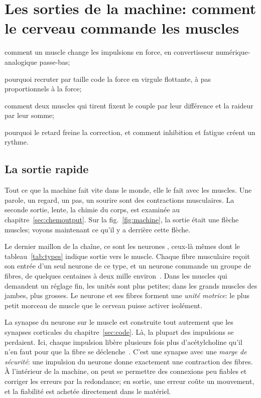 \chapter{Les sorties de la machine: comment le cerveau commande les muscles}
\label{sec:muscles}
\begin{chaptergoals}
\item comment un muscle change les impulsions en force, en convertisseur numérique-analogique passe-bas;
\item pourquoi recruter par taille code la force en virgule flottante, à pas proportionnels à la force;
\item comment deux muscles qui tirent fixent le couple par leur différence et la raideur par leur somme;
\item pourquoi le retard freine la correction, et comment inhibition et fatigue créent un rythme.
\end{chaptergoals}

\section{La sortie rapide}

Tout ce que la machine fait vite dans le monde, elle le fait avec les muscles. Une parole, un regard, un pas, un sourire sont des contractions musculaires. La seconde sortie, lente, la chimie du corps, est examinée au chapitre~\ref{sec:chemoutput}. Sur la fig.~\ref{fig:machine}, la sortie était une flèche \og muscles\fg{}; voyons maintenant ce qu'il y a derrière cette flèche.

Le dernier maillon de la chaîne, ce sont les neurones , ceux-là mêmes dont le tableau~\ref{tab:types} indique \og sortie vers le muscle\fg{}. Chaque fibre musculaire reçoit son entrée d'un seul neurone de ce type, et un neurone commande un groupe de fibres, de quelques centaines à deux mille environ~\cite{Feinstein1955mu}. Dans les muscles qui demandent un réglage fin, les unités sont plus petites; dans les grands muscles des jambes, plus grosses. Le neurone et ses fibres forment une \emph{unité motrice}: le plus petit morceau de muscle que le cerveau puisse activer isolément.

La synapse du neurone sur le muscle est construite tout autrement que les synapses corticales du chapitre~\ref{sec:code}. Là, la plupart des impulsions se perdaient. Ici, chaque impulsion libère plusieurs fois plus d'acétylcholine qu'il n'en faut pour que la fibre se déclenche~\cite{WoodSlater2001}. C'est une synapse avec une \emph{marge de sécurité}: une impulsion du neurone donne exactement une contraction des fibres. À l'intérieur de la machine, on peut se permettre des connexions peu fiables et corriger les erreurs par la redondance; en sortie, une erreur coûte un mouvement, et la fiabilité est achetée directement dans le matériel.

